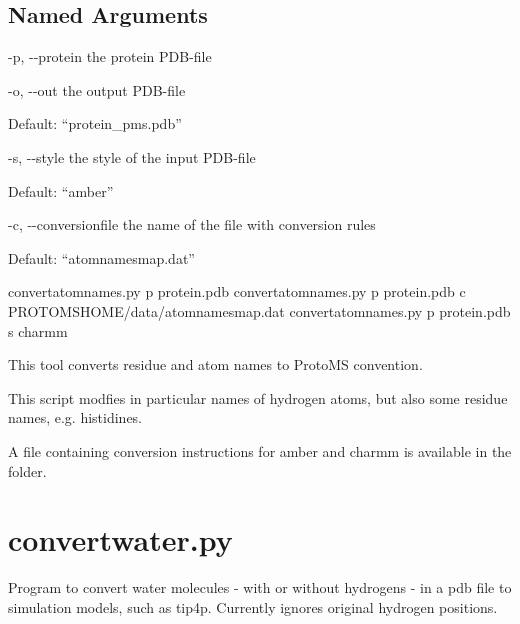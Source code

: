 \documentclass[letterpaper,10pt,english]{sphinxmanual}
\begin{document}
\subsection{Named Arguments}
\label{\detokenize{tools:Named Arguments}}\begin{optionlist}{3cm}
\item [-p, -{-}protein]  
the protein PDB-file
\item [-o, -{-}out]  
the output PDB-file

Default: “protein\_pms.pdb”
\item [-s, -{-}style]  
the style of the input PDB-file

Default: “amber”
\item [-c, -{-}conversionfile]  
the name of the file with conversion rules

Default: “atomnamesmap.dat”
\end{optionlist}


%
\begin{sphinxVerbatim}[commandchars=\\\{\}]
convertatomnames.py \PYGZhy{}p protein.pdb
convertatomnames.py \PYGZhy{}p protein.pdb \PYGZhy{}c \PYGZdl{}PROTOMSHOME/data/atomnamesmap.dat
convertatomnames.py \PYGZhy{}p protein.pdb \PYGZhy{}s charmm
\end{sphinxVerbatim}


This tool converts residue and atom names to ProtoMS convention.

This script modfies in particular names of hydrogen atoms, but also some residue names, e.g. histidines.

A file containing conversion instructions for amber and charmm is available in the  folder.


\section{convertwater.py}
\label{\detokenize{tools:convertwater-py}}

Program to convert water molecules - with or without hydrogens - in a pdb file to simulation models, such as tip4p. Currently ignores original hydrogen positions.


%
\begin{sphinxVerbatim}[commandchars=\\\{\}]
  \PYG{p}{[}\PYG{p}{]} \PYG{p}{[} \PYG{p}{]} \PYG{p}{[} \PYG{p}{]} \PYG{p}{[} \PYG{p}{]} \PYG{p}{[}\PYG{p}{]} \PYG{p}{[} \PYG{p}{]}
                       \PYG{p}{[} \PYG{p}{]}
\end{sphinxVerbatim}
\end{document}
